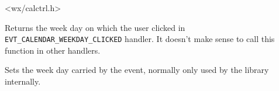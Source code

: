 
<wx/calctrl.h>





\label{wxcalendareventgetweekday}


Returns the week day on which the user clicked in 
{\tt EVT\_CALENDAR\_WEEKDAY\_CLICKED} handler. It doesn't make sense to call
this function in other handlers.


\label{wxcalendareventsetweekday}


Sets the week day carried by the event, normally only used by the library
internally.

